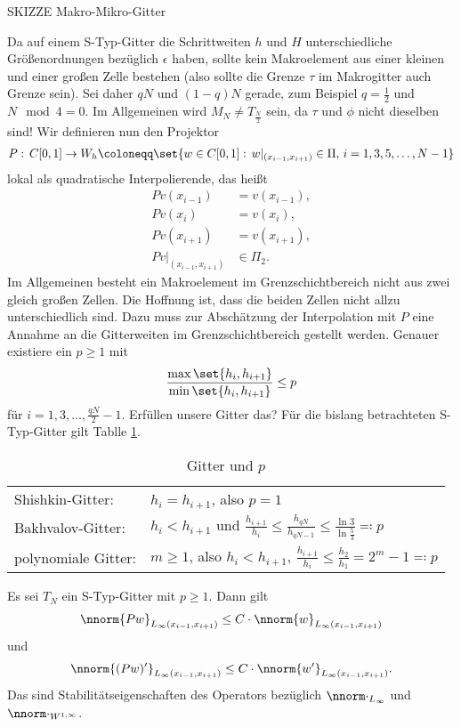 SKIZZE Makro-Mikro-Gitter

Da auf einem S-Typ-Gitter die Schrittweiten $h$ und $H$ unterschiedliche Größenordnungen bezüglich $\epsilon$ haben, sollte kein Makroelement aus einer kleinen und einer großen Zelle bestehen (also sollte die Grenze $\tau$ im Makrogitter auch Grenze sein). Sei daher $qN$ und $(1-q)N$ gerade, zum Beispiel $q = \frac 12$ und $N \mod 4 = 0$. Im Allgemeinen wird $M_{N} \neq T_{\frac N 2}$ sein, da $\tau$ und $\phi$ nicht dieselben sind! Wir definieren nun den Projektor
\begin{align*}
  P: \, C[0, 1] \to W_{h} \coloneqq \set{w \in C[0, 1]: \, w|_{(x_{i-1}, x_{i+1})} \in \Pi, \, i = 1, 3, 5, \dots, N-1}
\end{align*}
lokal als quadratische Interpolierende, das heißt
\begin{align*}
  Pv(x_{i-1}) &= v(x_{i-1}),\\
  Pv(x_{i}) &= v(x_{i}),\\
  Pv(x_{i+1}) &= v(x_{i+1}),\\
  Pv|_{(x_{i-1}, x_{i+1})} &\in \Pi_{2}.
\end{align*}
Im Allgemeinen besteht ein Makroelement im Grenzschichtbereich nicht aus zwei gleich großen Zellen. Die Hoffnung ist, dass die beiden Zellen nicht allzu unterschiedlich sind. Dazu muss zur Abschätzung der Interpolation mit $P$ eine Annahme an die Gitterweiten im Grenzschichtbereich gestellt werden. Genauer existiere ein $p\geq 1$ mit
\begin{align*}
  \frac{\max \set{h_{i}, h_{i+1}}}{\min \set{h_{i}, h_{i+1}}}\leq p
\end{align*}
für $i = 1, 3, \dots, \frac {qN} 2 - 1$. Erfüllen unsere Gitter das? Für die bislang betrachteten S-Typ-Gitter gilt Tablle \ref{tab:gitter_u_h}. 
\begin{table}[h!]
  \centering
  \begin{tabular}[h!]{l l}
    Shishkin-Gitter: & $h_{i} = h_{i+1}$, also $p = 1$\\
    Bakhvalov-Gitter: & $h_{i} < h_{i+1}$ und $\frac{h_{i+1}}{h_{i}} \leq \frac{h_{qN}}{h_{qN-1}} \leq \frac{\ln 3}{\ln \frac 53} \eqqcolon p$\\
    polynomiale Gitter: & $m \geq 1$, also $h_{i}< h_{i+1}$, $\frac{h_{i+1}}{h_{i}} \leq \frac{h_{2}}{h_{1}} = 2^{m} -1 \eqqcolon p$
  \end{tabular}
  \caption{Gitter und $p$}
  \label{tab:gitter_u_h}
\end{table}
\begin{lemma}\label{lem:6-17}
  Es sei $T_{N}$ ein S-Typ-Gitter mit $p\geq 1$. Dann gilt
  \begin{align*}
    \nnorm{Pw}_{L_{\infty}(x_{i-1}, x_{i+1})} \leq C \cdot\nnorm{w}_{L_{\infty}(x_{i-1}, x_{i+1})}
  \end{align*}
  und
  \begin{align*}
    \nnorm{(Pw)'}_{L_{\infty}(x_{i-1}, x_{i+1})} \leq C \cdot\nnorm{w'}_{L_{\infty}(x_{i-1}, x_{i+1})}. 
  \end{align*}
  Das sind Stabilitätseigenschaften des Operators bezüglich $\nnorm \cdot_{L_{\infty}}$ und $\nnorm \cdot_{W^{1, \infty}}$.
\end{lemma}
